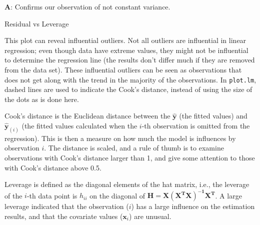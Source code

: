 \documentclass[10pt,ignorenonframetext,]{beamer}
\begin{document}
\begin{frame}

\textbf{A}: Confirms our observation of not constant variance.

\end{frame}

\begin{frame}[fragile]

\begin{block}{Residual vs Leverage}

This plot can reveal influential outliers. Not all outliers are
influential in linear regression; even though data have extreme values,
they might not be influential to determine the regression line (the
results don't differ much if they are removed from the data set). These
influential outliers can be seen as observations that does not get along
with the trend in the majority of the observations. In \texttt{plot.lm},
dashed lines are used to indicate the Cook's distance, instead of using
the size of the dots as is done here.

\end{block}

\end{frame}

\begin{frame}

Cook's distance is the Euclidean distance between the
\(\mathbf{\hat{y}}\) (the fitted values) and \(\mathbf{\hat{y}}_{(i)}\)
(the fitted values calculated when the \(i\)-th observation is omitted
from the regression). This is then a measure on how much the model is
influences by observation \(i\). The distance is scaled, and a rule of
thumb is to examine observations with Cook's distance larger than 1, and
give some attention to those with Cook's distance above 0.5.

Leverage is defined as the diagonal elements of the hat matrix, i.e.,
the leverage of the \(i\)-th data point is \(h_{ii}\) on the diagonal of
\(\mathbf{H = X(X^TX)^{-1}X^T}\). A large leverage indicated that the
observation (\(i\)) has a large influence on the estimation results, and
that the covariate values (\(\mathbf{x}_i\)) are unusual.

\end{frame}
\end{document}
